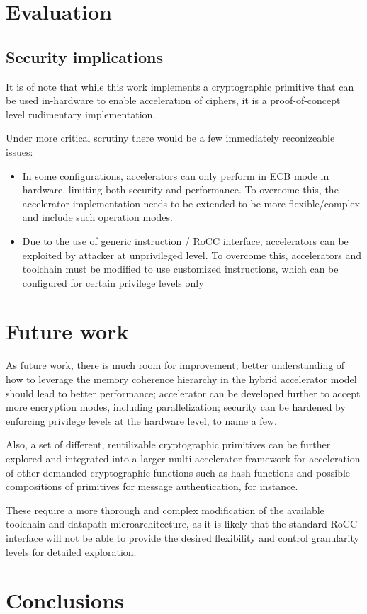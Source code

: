 \documentclass[10pt,conference]{IEEEtran}
\begin{document}
\section{Evaluation}

\subsection{Security implications}

It is of note that while this work implements a cryptographic primitive that can
be used in-hardware to enable acceleration of ciphers, it is a proof-of-concept
level rudimentary implementation.

Under more critical scrutiny there would be a few immediately reconizeable
issues:

\begin{itemize}
  \item In some configurations, accelerators can only perform in ECB mode in
    hardware, limiting both security and performance. To overcome this, the
    accelerator implementation needs to be extended to be more flexible/complex
    and include such operation modes.
  \item Due to the use of generic instruction / RoCC interface, accelerators
    can be exploited by attacker at unprivileged level. To overcome this,
    accelerators and toolchain must be modified to use customized instructions,
    which can be configured for certain privilege levels only
\end{itemize}

\section{Future work}

As future work, there is much room for improvement; better understanding of how
to leverage the memory coherence hierarchy in the hybrid accelerator model
should lead to better performance; accelerator can be developed further to
accept more encryption modes, including parallelization; security can be
hardened by enforcing privilege levels at the hardware level, to name a few.

Also, a set of different, reutilizable cryptographic primitives can be further
explored and integrated into a larger multi-accelerator framework for
acceleration of other demanded cryptographic functions such as hash functions
and possible compositions of primitives for message authentication, for instance.

These require a more thorough and complex modification of the available
toolchain and datapath microarchitecture, as it is likely that the standard RoCC
interface will not be able to provide the desired flexibility and control
granularity levels for detailed exploration.

\section{Conclusions}



\end{document}
